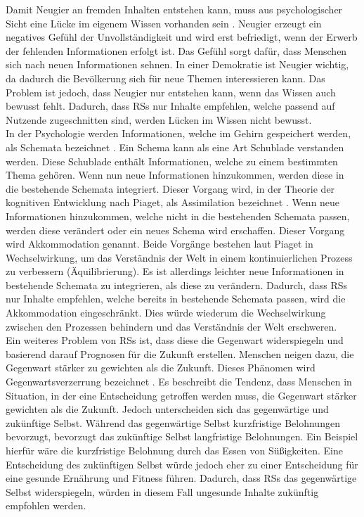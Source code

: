 Damit Neugier an fremden Inhalten entstehen kann, muss aus psychologischer Sicht eine Lücke im eigenem Wissen vorhanden sein \cite{handbook-emotion-curiosity}.
Neugier erzeugt ein negatives Gefühl der Unvollständigkeit und wird erst befriedigt, wenn der Erwerb der fehlenden Informationen erfolgt ist.
Das Gefühl sorgt dafür, dass Menschen sich nach neuen Informationen sehnen.
In einer Demokratie ist Neugier wichtig, da dadurch die Bevölkerung sich für neue Themen interessieren kann.
Das Problem ist jedoch, dass Neugier nur entstehen kann, wenn das Wissen auch bewusst fehlt.
Dadurch, dass \acp{RS} nur Inhalte empfehlen, welche passend auf Nutzende zugeschnitten sind, werden Lücken im Wissen nicht bewusst. \\

In der Psychologie werden Informationen, welche im Gehirn gespeichert werden, als Schemata bezeichnet \cite{schema}.
Ein Schema kann als eine Art Schublade verstanden werden.
Diese Schublade enthält Informationen, welche zu einem bestimmten Thema gehören.
Wenn nun neue Informationen hinzukommen, werden diese in die bestehende Schemata integriert.
Dieser Vorgang wird, in der Theorie der kognitiven Entwicklung nach Piaget, als Assimilation bezeichnet \cite{piaget}.
Wenn neue Informationen hinzukommen, welche nicht in die bestehenden Schemata passen, werden diese verändert oder ein neues Schema wird erschaffen.
Dieser Vorgang wird Akkommodation genannt.
Beide Vorgänge bestehen laut Piaget in Wechselwirkung, um das Verständnis der Welt in einem kontinuierlichen Prozess zu verbessern (Äquilibrierung).
Es ist allerdings leichter neue Informationen in bestehende Schemata zu integrieren, als diese zu verändern.
Dadurch, dass \acp{RS} nur Inhalte empfehlen, welche bereits in bestehende Schemata passen, wird die Akkommodation eingeschränkt.
Dies würde wiederum die Wechselwirkung zwischen den Prozessen behindern und das Verständnis der Welt erschweren. \\

Ein weiteres Problem von \acp{RS} ist, dass diese die Gegenwart widerspiegeln und basierend darauf Prognosen für die Zukunft erstellen.
Menschen neigen dazu, die Gegenwart stärker zu gewichten als die Zukunft.
Dieses Phänomen wird Gegenwartsverzerrung bezeichnet \cite{present-bias}.
Es beschreibt die Tendenz, dass Menschen in Situation, in der eine Entscheidung getroffen werden muss, die Gegenwart stärker gewichten als die Zukunft.
Jedoch unterscheiden sich das gegenwärtige und zukünftige Selbst.
Während das gegenwärtige Selbst kurzfristige Belohnungen bevorzugt, bevorzugt das zukünftige Selbst langfristige Belohnungen.
Ein Beispiel hierfür wäre die kurzfristige Belohnung durch das Essen von Süßigkeiten.
Eine Entscheidung des zukünftigen Selbst würde jedoch eher zu einer Entscheidung für eine gesunde Ernährung und Fitness führen.
Dadurch, dass \acp{RS} das gegenwärtige Selbst widerspiegeln, würden in diesem Fall ungesunde Inhalte zukünftig empfohlen werden.

